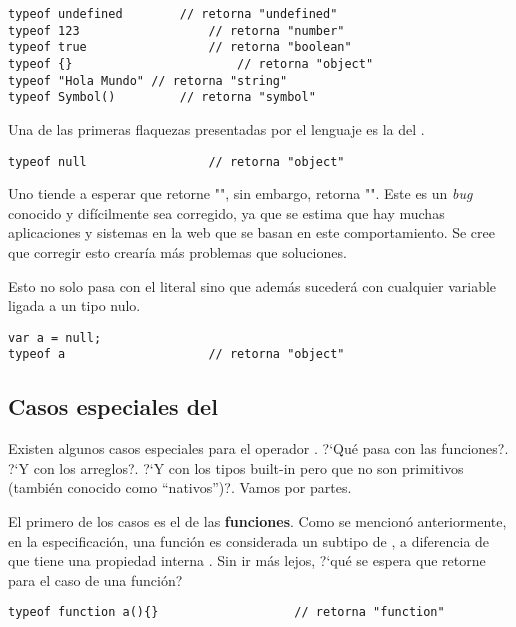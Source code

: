 \begin{lstlisting}[title={Analizando los tipos con \code{typeof}}]
typeof undefined		// retorna "undefined"
typeof 123					// retorna "number"
typeof true					// retorna "boolean"
typeof {}						// retorna "object"
typeof "Hola Mundo" // retorna "string"
typeof Symbol()			// retorna "symbol"
\end{lstlisting}

Una de las primeras flaquezas presentadas por el lenguaje es la del . 

\begin{lstlisting}[title={Analizando \code{typeof null}}]
typeof null					// retorna "object"
\end{lstlisting}

Uno tiende a esperar que  retorne "", sin embargo, retorna "". Este es un \textit{bug} conocido y difícilmente sea corregido, ya que se estima que hay muchas aplicaciones y sistemas en la web que se basan en este comportamiento. Se cree que corregir esto crearía más problemas que soluciones.

Esto no solo pasa con el literal  sino que además sucederá con cualquier variable ligada a un tipo nulo.

\begin{lstlisting}[title={Analizando \code{typeof null} (cont.)}]
var a = null;
typeof a					// retorna "object"
\end{lstlisting}

\subsection{Casos especiales del }

Existen algunos casos especiales para el operador . ?`Qué pasa con las funciones?. ?`Y con los arreglos?. ?`Y con los tipos built-in pero que no son primitivos (también conocido como "`nativos"')?. Vamos por partes.

El primero de los casos es el de las \textbf{funciones}. Como se mencionó anteriormente, en la especificación, una función es considerada un subtipo de , a diferencia de que tiene una propiedad interna \code{[[Call]]}. Sin ir más lejos, ?`qué se espera que retorne  para el caso de una función?

\begin{lstlisting}[title={Analizando \code{typeof} de una función}]
typeof function a(){}					// retorna "function"
\end{lstlisting}

